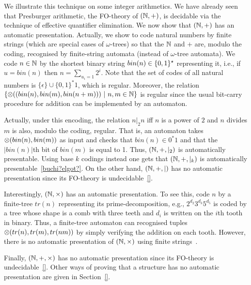 We illustrate this technique on some integer arithmetics. 
We have already seen that Presburger arithmetic, the FO-theory of $(\mathbb{N},+)$, is decidable via the technique of effective quantifier elimination. 
We now show that $(\mathbb{N},+)$ has an automatic presentation. Actually, we show to code natural numbers by finite strings (which are special cases of $\omega$-trees) 
so that the $\mathbb{N}$ and $+$ are, modulo the coding, recognised by finite-string automata (instead of $\omega$-tree automata).   
We code $n \in \mathbb{N}$ by the shortest binary string $bin(n) \in \{0,1\}^\star$ representing it, i.e., if $u = bin(n)$ then $n = \sum_{u_i = 1} 2^i$.  Note that the set of codes of all natural numbers is $\{\epsilon\} \cup \{0,1\}^\ast1$, which is regular. Moreover, the relation 
$\{\otimes((bin(n),bin(m),bin(n+m))) \ \vert \  n,m \in \mathbb{N}\}$ is regular since the usual bit-carry procedure for addition can be implemented by an automaton. 

Actually, under this encoding, the relation $n |_2 n$ iff $n$ is a power of $2$ and $n$ divides $m$ is also, modulo the coding, regular. 
That is, an automaton takes $\otimes(bin(n),bin(m))$ as input and checks that $bin(n) \in 0^\ast 1$ and that the $|bin(n)|$th bit of $bin(m)$ is equal to 1. Thus, $(\mathbb{N},+,|_2)$ is automatically presentable. Using base $k$ codings instead one gets that $(\mathbb{N},+,|_k)$ is automatically presentable~\ref{buchi?elgot?}. On the other hand, $(\mathbb{N},+,|)$ has no automatic presentation since its FO-theory is undecidable~\ref{}.

Interestingly, $(\mathbb{N},\times)$ has an automatic presentation. To see this, code $n$ by a finite-tree $tr(n)$ representing its 
prime-decomposition, e.g., $2^{d_2} 3^{d_3} 5^{d_5}$ is coded by a tree whose shape is a comb with three teeth and $d_i$ is written on the $i$th tooth in binary. 
Thus, a finite-tree automaton can recognised tuples $\otimes(tr(n),tr(m),tr(nm))$ by simply verifying the addition on each tooth. However, there is no automatic presentation of $(\mathbb{N},\times)$ using finite strings~\cite{}. 

Finally, $(\mathbb{N},+,\times)$ has no automatic presentation since its FO-theory is undecidable~\ref{}. Other ways of proving that a structure has no automatic presentation are given in Section~\ref{}.

